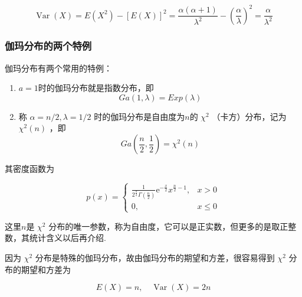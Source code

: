 \[
\operatorname{Var}(X)=E\left(X^{2}\right)-[E(X)]^{2}=\frac{\alpha(\alpha+1)}{\lambda^{2}}-\left(\frac{\alpha}{\lambda}\right)^{2}=\frac{\alpha}{\lambda^{2}}
\]

\subsubsection{伽玛分布的两个特例}

伽玛分布有两个常用的特例：

\begin{enumerate}
	\item $ a=1 $时的伽玛分布就是指数分布，即
	\begin{equation}
	G a(1, \lambda)=E x p(\lambda) \label{eq:2.5.13}
	\end{equation}
	\item 称 $\alpha=n / 2, \lambda=1 / 2$ 时的伽玛分布是自由度为$ n $的 $\chi^{2}$ （卡方）分布，记为 $\chi^{2}(n)$ ，即
	\begin{equation}
	G a\left(\frac{n}{2}, \frac{1}{2}\right)=\chi^{2}(n) \label{eq:2.5.14}
	\end{equation}
\end{enumerate}

其密度函数为

\begin{equation}
p(x)=\left\{\begin{array}{ll}
{\frac{1}{2^{\frac{\pi}{2}} \Gamma\left(\frac{n}{2}\right)} \mathrm{e}^{-\frac{x}{2}} x^{\frac{n}{2}-1},} & {x>0} \\ 
{0,} & {x \leqslant 0}
\end{array}\right. \label{eq:2.5.15}
\end{equation}

这里$ n $是 $\chi^{2}$ 分布的唯一参数，称为自由度，它可以是正实数，但更多的是取正整数，其统计含义以后再介绍.

因为 $\chi^{2}$ 分布是特殊的伽玛分布，故由伽玛分布的期望和方差，很容易得到 $\chi^{2}$ 分布的期望和方差为

\[
E(X)=n, \quad \operatorname{Var}(X)=2 n
\]

